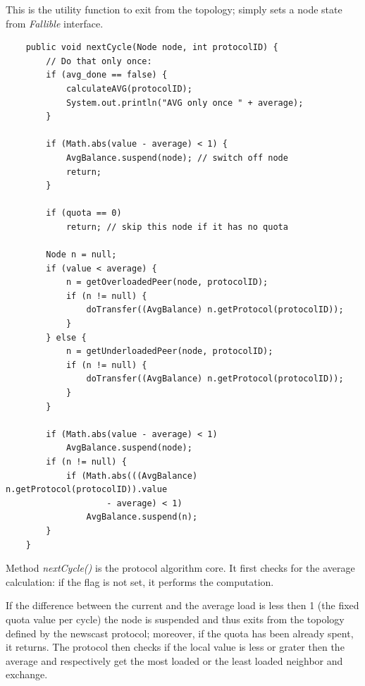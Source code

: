\documentclass[a4paper,11pt]{article}
\begin{document}
This is the utility function to exit from the topology; simply sets
a node state from \emph{Fallible} interface.

\footnotesize
\begin{verbatim}
    public void nextCycle(Node node, int protocolID) {
        // Do that only once:
        if (avg_done == false) {
            calculateAVG(protocolID);
            System.out.println("AVG only once " + average);
        }

        if (Math.abs(value - average) < 1) {
            AvgBalance.suspend(node); // switch off node
            return;
        }

        if (quota == 0)
            return; // skip this node if it has no quota

        Node n = null;
        if (value < average) {
            n = getOverloadedPeer(node, protocolID);
            if (n != null) {
                doTransfer((AvgBalance) n.getProtocol(protocolID));
            }
        } else {
            n = getUnderloadedPeer(node, protocolID);
            if (n != null) {
                doTransfer((AvgBalance) n.getProtocol(protocolID));
            }
        }

        if (Math.abs(value - average) < 1)
            AvgBalance.suspend(node);
        if (n != null) {
            if (Math.abs(((AvgBalance) n.getProtocol(protocolID)).value
                    - average) < 1)
                AvgBalance.suspend(n);
        }
    }
\end{verbatim}
\normalsize

Method \emph{nextCycle()} is the protocol algorithm core. It first
checks for the average calculation: if the flag is not set, it performs
the computation.

If the difference between the current and the average load is less
then 1 (the fixed quota value per cycle) the node is suspended and
thus exits from the topology defined by the newscast protocol; moreover,
if the quota has been already spent, it returns. The protocol then
checks if the local value is less or grater then the average and respectively
get the most loaded or the least loaded neighbor and exchange.
\end{document}

